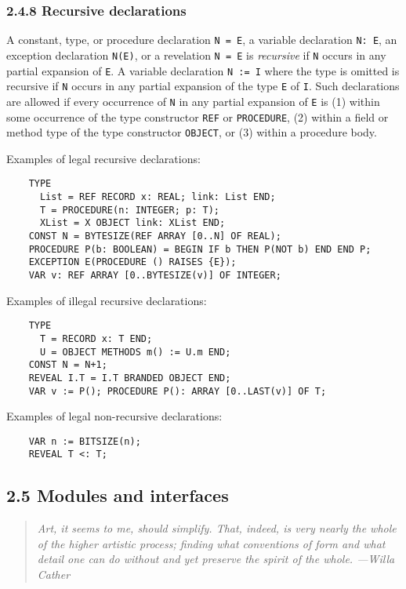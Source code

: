\documentclass[10pt]{article}
\begin{document}
\subsubsection*{2.4.8 Recursive declarations}

A constant, type, or procedure declaration \verb|N = E|, a variable
declaration \verb|N: E|, an exception declaration \verb|N(E)|, or a revelation
\verb|N = E| is \emph{recursive} if \verb|N| occurs in any partial expansion
of \verb|E|.  A variable declaration \verb|N := I| where the type is omitted
is recursive if \verb|N| occurs in any partial expansion of the type \verb|E|
of \verb|I|.  Such declarations are allowed if every occurrence of \verb|N| in
any partial expansion of \verb|E| is (1) within some occurrence of the type
constructor \verb|REF| or \verb|PROCEDURE|, (2) within a field or method type
of the type constructor \verb|OBJECT|, or (3) within a procedure body.

Examples of legal recursive declarations:
\begin{verbatim}
    TYPE
      List = REF RECORD x: REAL; link: List END;
      T = PROCEDURE(n: INTEGER; p: T);
      XList = X OBJECT link: XList END;
    CONST N = BYTESIZE(REF ARRAY [0..N] OF REAL);
    PROCEDURE P(b: BOOLEAN) = BEGIN IF b THEN P(NOT b) END END P;
    EXCEPTION E(PROCEDURE () RAISES {E});
    VAR v: REF ARRAY [0..BYTESIZE(v)] OF INTEGER;
\end{verbatim}

Examples of illegal recursive declarations:
\begin{verbatim}
    TYPE
      T = RECORD x: T END;
      U = OBJECT METHODS m() := U.m END;
    CONST N = N+1;
    REVEAL I.T = I.T BRANDED OBJECT END;
    VAR v := P(); PROCEDURE P(): ARRAY [0..LAST(v)] OF T;
\end{verbatim}

Examples of legal non-recursive declarations:
\begin{verbatim}
    VAR n := BITSIZE(n);
    REVEAL T <: T;
\end{verbatim}

\subsection*{2.5 Modules and interfaces}

\begin{quote}
  \emph{Art, it seems to me, should simplify.  That, indeed, is very nearly
    the whole of the higher artistic process; finding what conventions of form
    and what detail one can do without and yet preserve the spirit of the
    whole.  ---Willa Cather}
\end{quote}
\end{document}
